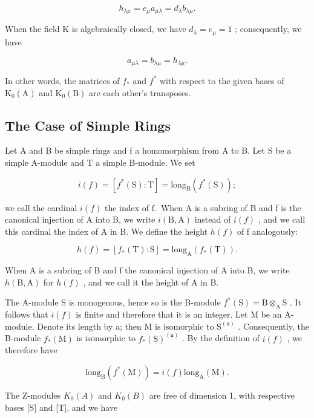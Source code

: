 \[
h _ {\lambda \mu} = e _ {\mu} a _ {\mu \lambda} = d _ {\lambda} b _ {\lambda \mu}.\tag{24}
\]

When the field K is algebraically closed, we have \(d_{\lambda} = e_{\mu} = 1\) ; consequently, we have

\[
a _ {\mu \lambda} = b _ {\lambda \mu} = h _ {\lambda \mu}.\tag{25}
\]

In other words, the matrices of \(f_{*}\) and \(f^{*}\) with respect to the given bases of \(\mathrm{K}_0(\mathrm{A})\) and \(\mathrm{K}_0(\mathrm{B})\) are each other's transposes.

\subsection{The Case of Simple Rings}

Let A and B be simple rings and f a homomorphism from A to B. Let S be a simple A-module and T a simple B-module. We set

\[
i (f) = [ f ^ {*} (\mathrm{S}): \mathrm{T} ] = \mathrm{long} _ {\mathrm{B}} (f ^ {*} (\mathrm{S}));\tag{26}
\]

we call the cardinal \(i(f)\) the index of f.~When A is a subring of B and f is the canonical injection of A into B, we write \(i(\mathrm{B},\mathrm{A})\) instead of \(i(f)\) , and we call this cardinal the index of A in B. We define the height \(h(f)\) of f analogously:

\[
h (f) = [ f _ {*} (\mathrm{T}): \mathrm{S} ] = \mathrm{long} _ {\mathrm{A}} (f _ {*} (\mathrm{T})).\tag{27}
\]

When A is a subring of B and f the canonical injection of A into B, we write \(h(\mathrm{B}, \mathrm{A})\) for \(h(f)\) , and we call it the height of A in B.

The A-module S is monogenous, hence so is the B-module \(f^{*}(\mathrm{S}) = \mathrm{B} \otimes_{\mathrm{A}} \mathrm{S}\) . It follows that \(i(f)\) is finite and therefore that it is an integer. Let M be an A-module. Denote its length by a; then M is isomorphic to \(\mathrm{S}^{(\mathfrak{a})}\) . Consequently, the B-module \(f_{*}(\mathrm{M})\) is isomorphic to \(f_{*}(\mathrm{S})^{(\mathfrak{a})}\) . By the definition of \(i(f)\) , we therefore have

\[
\mathrm{long} _ {\mathrm{B}} (f ^ {*} (\mathrm{M})) = i (f) \mathrm{long} _ {\mathrm{A}} (\mathrm{M}).\tag{28}
\]

The Z-modules \(K_{0}(A)\) and \(K_{0}(B)\) are free of dimension 1, with respective bases {[}S{]} and {[}T{]}, and we have

